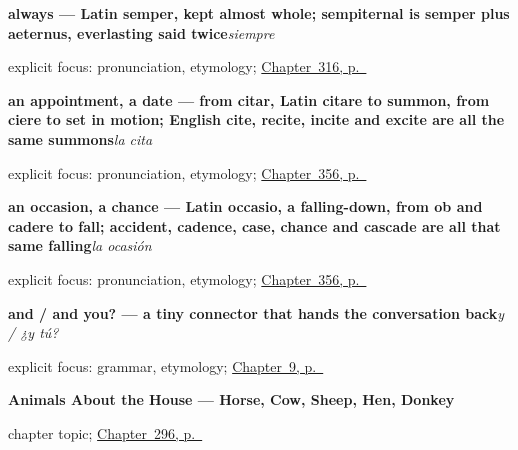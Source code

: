 \noindent\begin{minipage}[t]{\linewidth}
\raggedright
\textbf{always — Latin semper, kept almost whole; sempiternal is semper plus aeternus, everlasting said twice}\enspace\emph{siempre}\par
\footnotesize explicit focus: pronunciation, etymology; \hyperref[ch:nunca-y-siempre]{Chapter~316, p.~\pageref*{ch:nunca-y-siempre}}
\end{minipage}\par\smallskip

\noindent\begin{minipage}[t]{\linewidth}
\raggedright
\textbf{an appointment, a date — from citar, Latin citare to summon, from ciere to set in motion; English cite, recite, incite and excite are all the same summons}\enspace\emph{la cita}\par
\footnotesize explicit focus: pronunciation, etymology; \hyperref[ch:desde-y-de-repente]{Chapter~356, p.~\pageref*{ch:desde-y-de-repente}}
\end{minipage}\par\smallskip

\noindent\begin{minipage}[t]{\linewidth}
\raggedright
\textbf{an occasion, a chance — Latin occasio, a falling-down, from ob and cadere to fall; accident, cadence, case, chance and cascade are all that same falling}\enspace\emph{la ocasión}\par
\footnotesize explicit focus: pronunciation, etymology; \hyperref[ch:desde-y-de-repente]{Chapter~356, p.~\pageref*{ch:desde-y-de-repente}}
\end{minipage}\par\smallskip

\noindent\begin{minipage}[t]{\linewidth}
\raggedright
\textbf{and / and you? — a tiny connector that hands the conversation back}\enspace\emph{y / ¿y tú?}\par
\footnotesize explicit focus: grammar, etymology; \hyperref[ch:answering]{Chapter~9, p.~\pageref*{ch:answering}}
\end{minipage}\par\smallskip

\noindent\begin{minipage}[t]{\linewidth}
\raggedright
\textbf{Animals About the House --- Horse, Cow, Sheep, Hen, Donkey}\par
\footnotesize chapter topic; \hyperref[ch:animales]{Chapter~296, p.~\pageref*{ch:animales}}
\end{minipage}\par\smallskip

